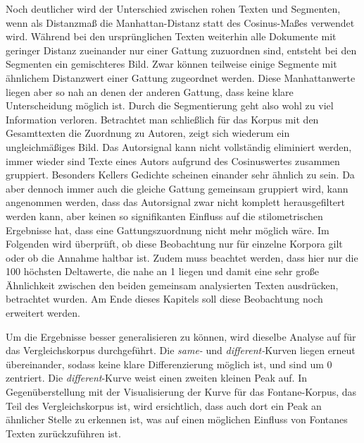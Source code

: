 \documentclass[a4paper,10p]{article}
\begin{document}
Noch deutlicher wird der Unterschied zwischen rohen Texten und Segmenten, wenn als Distanzmaß die Manhattan-Distanz statt des Cosinus-Maßes verwendet wird. Während bei den ursprünglichen Texten weiterhin alle Dokumente mit geringer Distanz zueinander nur einer Gattung zuzuordnen sind, entsteht bei den Segmenten ein gemischteres Bild. Zwar können teilweise einige Segmente mit ähnlichem Distanzwert einer Gattung zugeordnet werden. Diese Manhattanwerte liegen aber so nah an denen der anderen Gattung, dass keine klare Unterscheidung möglich ist. Durch die Segmentierung geht also wohl zu viel Information verloren. Betrachtet man schließlich für das Korpus mit den Gesamttexten die Zuordnung zu Autoren, zeigt sich wiederum ein ungleichmäßiges Bild. Das Autorsignal kann nicht vollständig eliminiert werden, immer wieder sind Texte eines Autors aufgrund des Cosinuswertes zusammen gruppiert. Besonders Kellers Gedichte scheinen einander sehr ähnlich zu sein. Da aber dennoch immer auch die gleiche Gattung gemeinsam gruppiert wird, kann angenommen werden, dass das Autorsignal zwar nicht komplett herausgefiltert werden kann, aber keinen so signifikanten Einfluss auf die stilometrischen Ergebnisse hat, dass eine Gattungszuordnung nicht mehr möglich wäre. Im Folgenden wird überprüft, ob diese Beobachtung nur für einzelne Korpora gilt oder ob die Annahme haltbar ist. Zudem muss beachtet werden, dass hier nur die 100 höchsten Deltawerte, die nahe an 1 liegen und damit eine sehr große Ähnlichkeit zwischen den beiden gemeinsam analysierten Texten ausdrücken, betrachtet wurden. Am Ende dieses Kapitels soll diese Beobachtung noch erweitert werden. \par 

Um die Ergebnisse besser generalisieren zu können, wird dieselbe Analyse auf für das Vergleichskorpus durchgeführt. Die \textit{same-} und  \textit{different-}Kurven liegen erneut übereinander, sodass keine klare Differenzierung möglich ist, und sind um 0 zentriert. Die \textit{different}-Kurve weist einen zweiten kleinen Peak auf. In Gegenüberstellung mit der Visualisierung der Kurve für das Fontane-Korpus, das Teil des Vergleichskorpus ist, wird ersichtlich, dass auch dort ein Peak an ähnlicher Stelle zu erkennen ist, was auf einen möglichen Einfluss von Fontanes Texten zurückzuführen ist. \par 
\end{document}
